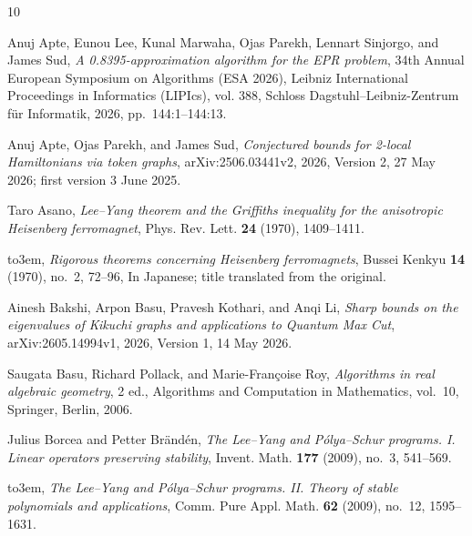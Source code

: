 \documentclass[reqno]{amsart}
\theoremstyle{definition}
\theoremstyle{remark}
\begin{document}
\makeatletter{}\makeatother
\providecommand{\bysame}{\leavevmode\hbox to3em{\hrulefill}\thinspace}
\providecommand{\MR}{\relax\ifhmode\unskip\space\fi MR }
\providecommand{\MRhref}[2]{%
  \href{http://www.ams.org/mathscinet-getitem?mr=#1}{#2}
}
\providecommand{\href}[2]{#2}
\begin{thebibliography}{10}

Anuj Apte, Eunou Lee, Kunal Marwaha, Ojas Parekh, Lennart Sinjorgo, and James
  Sud, \emph{A 0.8395-approximation algorithm for the {EPR} problem}, 34th
  Annual European Symposium on Algorithms ({ESA} 2026), Leibniz International
  Proceedings in Informatics (LIPIcs), vol. 388, Schloss
  Dagstuhl--Leibniz-Zentrum f{\"u}r Informatik, 2026, pp.~144:1--144:13.

Anuj Apte, Ojas Parekh, and James Sud, \emph{Conjectured bounds for 2-local
  {Hamiltonians} via token graphs}, arXiv:2506.03441v2, 2026, Version 2, 27 May
  2026; first version 3 June 2025.

Taro Asano, \emph{{Lee--Yang} theorem and the {Griffiths} inequality for the
  anisotropic {Heisenberg} ferromagnet}, Phys. Rev. Lett. \textbf{24} (1970),
  1409--1411.

\bysame, \emph{Rigorous theorems concerning {Heisenberg} ferromagnets}, Bussei
  Kenkyu \textbf{14} (1970), no.~2, 72--96, In Japanese; title translated from
  the original.

Ainesh Bakshi, Arpon Basu, Pravesh Kothari, and Anqi Li, \emph{Sharp bounds on
  the eigenvalues of {Kikuchi} graphs and applications to {Quantum Max Cut}},
  arXiv:2605.14994v1, 2026, Version 1, 14 May 2026.

Saugata Basu, Richard Pollack, and Marie-Fran{\c c}oise Roy, \emph{Algorithms
  in real algebraic geometry}, 2 ed., Algorithms and Computation in
  Mathematics, vol.~10, Springer, Berlin, 2006.

Julius Borcea and Petter Br{\"a}nd{\'e}n, \emph{The {Lee--Yang} and
  {P{\'o}lya--Schur} programs. {I}. {Linear} operators preserving stability},
  Invent. Math. \textbf{177} (2009), no.~3, 541--569.

\bysame, \emph{The {Lee--Yang} and {P{\'o}lya--Schur} programs. {II}. {Theory}
  of stable polynomials and applications}, Comm. Pure Appl. Math. \textbf{62}
  (2009), no.~12, 1595--1631.


\end{thebibliography}
\end{document}
